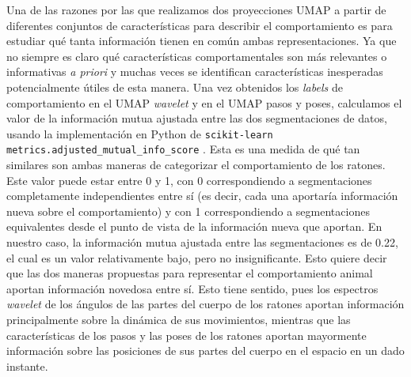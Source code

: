 Una de las razones por las que realizamos dos proyecciones UMAP a partir de diferentes conjuntos de características para describir el comportamiento es para estudiar qué tanta información tienen en común ambas representaciones. Ya que no siempre es claro qué características comportamentales son más relevantes o informativas \textit{a priori} y muchas veces se identifican características inesperadas potencialmente útiles de esta manera. Una vez obtenidos los \textit{labels} de comportamiento en el UMAP \textit{wavelet} y en el UMAP pasos y poses, calculamos el valor de la información mutua ajustada entre las dos segmentaciones de datos, usando la implementación en Python de \texttt{scikit-learn} \texttt{metrics.adjusted\_mutual\_info\_score} \cite{scikit-learn, adjusted_mutual_info_score}. Esta es una medida de qué tan similares son ambas maneras de categorizar el comportamiento de los ratones. Este valor puede estar entre 0 y 1, con 0 correspondiendo a segmentaciones completamente independientes entre sí (es decir, cada una aportaría información nueva sobre el comportamiento) y con 1 correspondiendo a segmentaciones equivalentes desde el punto de vista de la información nueva que aportan. En nuestro caso, la información mutua ajustada entre las segmentaciones es de 0.22, el cual es un valor relativamente bajo, pero no insignificante. Esto quiere decir que las dos maneras propuestas para representar el comportamiento animal aportan información novedosa entre sí. Esto tiene sentido, pues los espectros \textit{wavelet} de los ángulos de las partes del cuerpo de los ratones aportan información principalmente sobre la dinámica de sus movimientos, mientras que las características de los pasos y las poses de los ratones aportan mayormente información sobre las posiciones de sus partes del cuerpo en el espacio en un dado instante.

